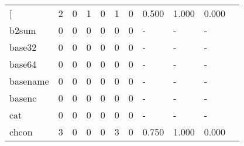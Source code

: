 \begin{longtable}{lp{1.10cm}p{1.10cm}p{1.10cm}p{1.10cm}p{1.10cm}p{1.10cm}p{1.10cm}p{1.10cm}p{1.10cm}p{1.10cm}}
\bottomrule
\endlastfoot
{[}         &                      2 &                                  0 &                                 1 &                                0 &                                 1 &                               0 &                          0.500 &                                 1.000 &                               0.000 \\
b2sum     &                      0 &                                  0 &                                 0 &                                0 &                                 0 &                               0 &                              - &                                     - &                                   - \\
base32    &                      0 &                                  0 &                                 0 &                                0 &                                 0 &                               0 &                              - &                                     - &                                   - \\
base64    &                      0 &                                  0 &                                 0 &                                0 &                                 0 &                               0 &                              - &                                     - &                                   - \\
basename  &                      0 &                                  0 &                                 0 &                                0 &                                 0 &                               0 &                              - &                                     - &                                   - \\
basenc    &                      0 &                                  0 &                                 0 &                                0 &                                 0 &                               0 &                              - &                                     - &                                   - \\
cat       &                      0 &                                  0 &                                 0 &                                0 &                                 0 &                               0 &                              - &                                     - &                                   - \\
chcon     &                      3 &                                  0 &                                 0 &                                0 &                                 3 &                               0 &                          0.750 &                                 1.000 &                               0.000 \\

\end{longtable}
